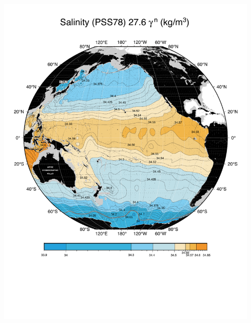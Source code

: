 \documentclass{beamer}
\begin{document}
\begin{frame}[plain,t]
    \begin{columns}
      \begin{column}{0.33\textwidth}
        \includegraphics[width=\textwidth]{salnty_isopyc_final_pdf/pac2760_salnty_final_color.pdf}  
       \end{column}
      \begin{column}{0.33\textwidth}

\end{column}
\end{columns}
\end{frame}
\end{document}
